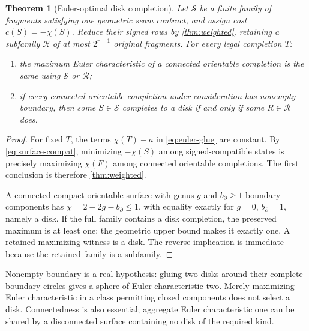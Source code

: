 \documentclass[11pt,letterpaper]{article}
\newtheorem{theorem}{Theorem}[section]
\theoremstyle{definition}
\begin{document}
\begin{theorem}[Euler-optimal disk completion]\label{thm:disk-completion}
Let $\mathcal S$ be a finite family of fragments satisfying one geometric seam contract, and assign cost $c(S)=-\chi(S)$. Reduce their signed rows by \cref{thm:weighted}, retaining a subfamily $\mathcal R$ of at most $2^{r-1}$ original fragments. For every legal completion $T$:
\begin{enumerate}
\item the maximum Euler characteristic of a connected orientable completion is the same using $\mathcal S$ or $\mathcal R$;
\item if every connected orientable completion under consideration has nonempty boundary, then some $S\in\mathcal S$ completes to a disk if and only if some $R\in\mathcal R$ does.
\end{enumerate}
\end{theorem}
\begin{proof}
For fixed $T$, the terms $\chi(T)-a$ in \eqref{eq:euler-glue} are constant. By \eqref{eq:surface-compat}, minimizing $-\chi(S)$ among signed-compatible states is precisely maximizing $\chi(F)$ among connected orientable completions. The first conclusion is therefore \cref{thm:weighted}.

A connected compact orientable surface with genus $g$ and $b_{\partial}\ge1$ boundary components has $\chi=2-2g-b_{\partial}\le1$, with equality exactly for $g=0$, $b_{\partial}=1$, namely a disk. If the full family contains a disk completion, the preserved maximum is at least one; the geometric upper bound makes it exactly one. A retained maximizing witness is a disk. The reverse implication is immediate because the retained family is a subfamily.
\end{proof}

Nonempty boundary is a real hypothesis: gluing two disks around their complete boundary circles gives a sphere of Euler characteristic two. Merely maximizing Euler characteristic in a class permitting closed components does not select a disk. Connectedness is also essential; aggregate Euler characteristic one can be shared by a disconnected surface containing no disk of the required kind.
\end{document}
